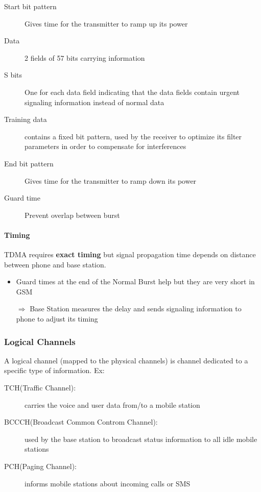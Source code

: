 \begin{itemize}
        \begin{description}
            \item[Start bit pattern] Gives time for the transmitter to ramp up its power
            \item[Data] 2 fields of 57 bits carrying information
            \item [S bits] One for each data field indicating that the data fields contain
                urgent signaling information instead of normal data
            \item [Training data] contains a fixed bit pattern, used by the receiver to 
                optimize its filter parameters in order to compensate for interferences
            \item [End bit pattern] Gives time for the transmitter to ramp down its power
            \item[Guard time] Prevent overlap between burst
        \end{description}

        \paragraph{Timing}
        TDMA requires \textbf{exact timing} but signal propagation time depends on distance
        between phone and base station. 
        \begin{itemize}
            \item Guard times at the end of the Normal Burst help but they are very
                short in GSM
            \item[$\Rightarrow$]Base Station measures the delay and
                sends signaling information to phone to adjust its
                timing
        \end{itemize}
\end{itemize}

\subsubsection{Logical Channels}
A logical channel (mapped to the physical channels) is channel dedicated to a specific type of 
information. Ex:
\begin{description}
    \item[TCH(Traffic Channel):] carries the voice and user data from/to a 
        mobile station
    \item[BCCCH(Broadcast Common Controm Channel):]used by the base station to 
        broadcast status information to all idle mobile stations
    \item[PCH(Paging Channel):] informs mobile stations about incoming calls or SMS
\end{description}

